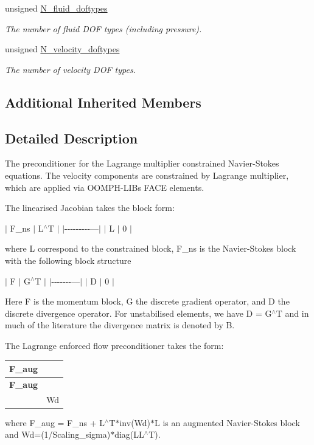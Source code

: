 \begin{DoxyCompactItemize}
unsigned \hyperlink{classoomph_1_1LagrangeEnforcedFlowPreconditioner_a1c3f53129425f029bf918f33430c0635}{N\+\_\+fluid\+\_\+doftypes}
\begin{DoxyCompactList}\small\item\em The number of fluid D\+OF types (including pressure). \end{DoxyCompactList}\item 
unsigned \hyperlink{classoomph_1_1LagrangeEnforcedFlowPreconditioner_afdf4577b51473f146c55cb6016b11797}{N\+\_\+velocity\+\_\+doftypes}
\begin{DoxyCompactList}\small\item\em The number of velocity D\+OF types. \end{DoxyCompactList}\end{DoxyCompactItemize}
\subsection*{Additional Inherited Members}


\subsection{Detailed Description}
The preconditioner for the Lagrange multiplier constrained Navier-\/\+Stokes equations. The velocity components are constrained by Lagrange multiplier, which are applied via O\+O\+M\+P\+H-\/\+L\+IB\textquotesingle{}s F\+A\+CE elements. 

The linearised Jacobian takes the block form\+:

$\vert$ F\+\_\+ns $\vert$ L$^\wedge$T $\vert$ $\vert$-\/-\/-\/-\/-\/-\/-\/-\/-\/---$\vert$ $\vert$ L $\vert$ 0 $\vert$

where L correspond to the constrained block, F\+\_\+ns is the Navier-\/\+Stokes block with the following block structure

$\vert$ F $\vert$ G$^\wedge$T $\vert$ $\vert$-\/-\/-\/-\/-\/-\/-\/---$\vert$ $\vert$ D $\vert$ 0 $\vert$

Here F is the momentum block, G the discrete gradient operator, and D the discrete divergence operator. For unstabilised elements, we have D = G$^\wedge$T and in much of the literature the divergence matrix is denoted by B.

The Lagrange enforced flow preconditioner takes the form\+: \tabulinesep=1mm
\begin{longtabu} spread 0pt [c]{*{2}{|X[-1]}|}
\hline
\rowcolor{\tableheadbgcolor}\textbf{ F\+\_\+aug }&\textbf{ }\\
\endfirsthead
\hline
\endfoot
\hline
\rowcolor{\tableheadbgcolor}\textbf{ F\+\_\+aug }&\textbf{ }\\
\endhead
&Wd \\
\end{longtabu}
where F\+\_\+aug = F\+\_\+ns + L$^\wedge$\+T$\ast$inv(Wd)$\ast$L is an augmented Navier-\/\+Stokes block and Wd=(1/\+Scaling\+\_\+sigma)$\ast$diag(L\+L$^\wedge$T).

